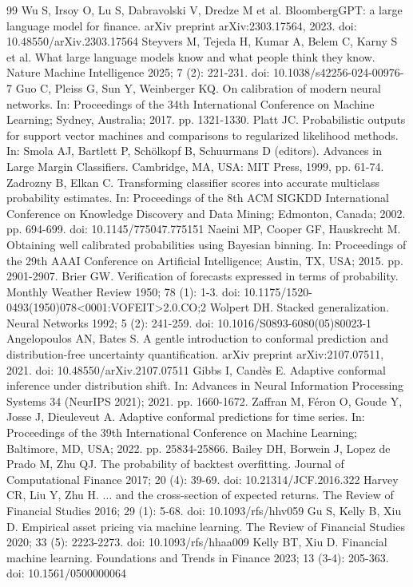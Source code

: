 \documentclass{elektr}
\begin{document}
\begin{thebibliography}{99}
 Wu S, Irsoy O, Lu S, Dabravolski V, Dredze M et al. BloombergGPT: a large language model for finance. arXiv preprint arXiv:2303.17564, 2023. doi: 10.48550/arXiv.2303.17564
 Steyvers M, Tejeda H, Kumar A, Belem C, Karny S et al. What large language models know and what people think they know. Nature Machine Intelligence 2025; 7 (2): 221-231. doi: 10.1038/s42256-024-00976-7
 Guo C, Pleiss G, Sun Y, Weinberger KQ. On calibration of modern neural networks. In: Proceedings of the 34th International Conference on Machine Learning; Sydney, Australia; 2017. pp. 1321-1330.
 Platt JC. Probabilistic outputs for support vector machines and comparisons to regularized likelihood methods. In: Smola AJ, Bartlett P, Sch\"{o}lkopf B, Schuurmans D (editors). Advances in Large Margin Classifiers. Cambridge, MA, USA: MIT Press, 1999, pp. 61-74.
 Zadrozny B, Elkan C. Transforming classifier scores into accurate multiclass probability estimates. In: Proceedings of the 8th ACM SIGKDD International Conference on Knowledge Discovery and Data Mining; Edmonton, Canada; 2002. pp. 694-699. doi: 10.1145/775047.775151
 Naeini MP, Cooper GF, Hauskrecht M. Obtaining well calibrated probabilities using Bayesian binning. In: Proceedings of the 29th AAAI Conference on Artificial Intelligence; Austin, TX, USA; 2015. pp. 2901-2907.
 Brier GW. Verification of forecasts expressed in terms of probability. Monthly Weather Review 1950; 78 (1): 1-3. doi: 10.1175/1520-0493(1950)078<0001:VOFEIT>2.0.CO;2
 Wolpert DH. Stacked generalization. Neural Networks 1992; 5 (2): 241-259. doi: 10.1016/S0893-6080(05)80023-1
 Angelopoulos AN, Bates S. A gentle introduction to conformal prediction and distribution-free uncertainty quantification. arXiv preprint arXiv:2107.07511, 2021. doi: 10.48550/arXiv.2107.07511
 Gibbs I, Cand\`{e}s E. Adaptive conformal inference under distribution shift. In: Advances in Neural Information Processing Systems 34 (NeurIPS 2021); 2021. pp. 1660-1672.
 Zaffran M, F\'eron O, Goude Y, Josse J, Dieuleveut A. Adaptive conformal predictions for time series. In: Proceedings of the 39th International Conference on Machine Learning; Baltimore, MD, USA; 2022. pp. 25834-25866.
 Bailey DH, Borwein J, Lopez de Prado M, Zhu QJ. The probability of backtest overfitting. Journal of Computational Finance 2017; 20 (4): 39-69. doi: 10.21314/JCF.2016.322
 Harvey CR, Liu Y, Zhu H. $\ldots$ and the cross-section of expected returns. The Review of Financial Studies 2016; 29 (1): 5-68. doi: 10.1093/rfs/hhv059
 Gu S, Kelly B, Xiu D. Empirical asset pricing via machine learning. The Review of Financial Studies 2020; 33 (5): 2223-2273. doi: 10.1093/rfs/hhaa009
 Kelly BT, Xiu D. Financial machine learning. Foundations and Trends in Finance 2023; 13 (3-4): 205-363. doi: 10.1561/0500000064
\end{thebibliography}
\end{document}
